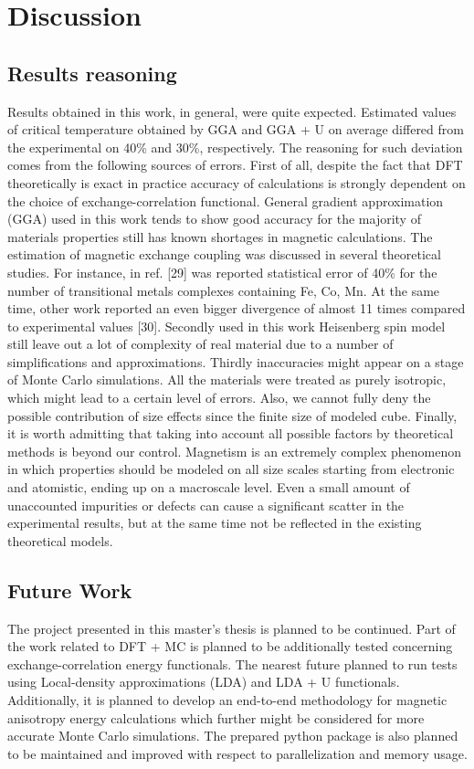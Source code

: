 \chapter{Discussion}
\section{Results reasoning}
Results obtained in this work, in general, were quite expected. Estimated values of critical temperature obtained by GGA and GGA + U on average differed from the experimental on 40\% and 30\%, respectively. The reasoning for such deviation comes from the following sources of errors. First of all, despite the fact that DFT theoretically is exact in practice accuracy of calculations is strongly dependent on the choice of exchange-correlation functional. General gradient approximation (GGA) used in this work tends to show good accuracy for the majority of materials properties still has known shortages in magnetic calculations. The estimation of magnetic exchange coupling was discussed in several theoretical studies. For instance, in ref. [29] was reported statistical error of 40\% for the number of transitional metals complexes containing Fe, Co, Mn. At the same time, other work reported an even bigger divergence of almost 11 times compared to experimental values [30]. Secondly used in this work Heisenberg spin model still leave out a lot of complexity of real material due to a number of simplifications and approximations. Thirdly inaccuracies might appear on a stage of Monte Carlo simulations. All the materials were treated as purely isotropic, which might lead to a certain level of errors. Also, we cannot fully deny the possible contribution of size effects since the finite size of modeled cube. Finally, it is worth admitting that taking into account all possible factors by theoretical methods is beyond our control. Magnetism is an extremely complex phenomenon in which properties should be modeled on all size scales starting from electronic and atomistic, ending up on a macroscale level.  Even a small amount of unaccounted impurities or defects can cause a significant scatter in the experimental results, but at the same time not be reflected in the existing theoretical models.



\section{Future Work}

The project presented in this master's thesis is planned to be continued.
Part of the work related to DFT + MC  is planned to be additionally tested concerning exchange-correlation energy functionals. The nearest future planned to run tests using Local-density approximations (LDA) and LDA + U functionals. Additionally, it is planned to develop an end-to-end methodology for magnetic anisotropy energy calculations which further might be considered for more accurate Monte Carlo simulations. The prepared python package is also planned to be maintained and improved with respect to parallelization and memory usage.

